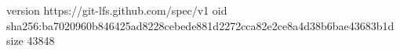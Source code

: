 version https://git-lfs.github.com/spec/v1
oid sha256:ba7020960b846425ad8228cebede881d2272cca82e2ce8a4d38b6bae43683b1d
size 43848

